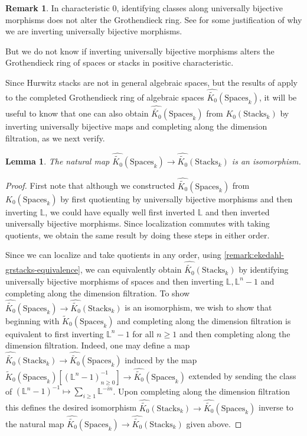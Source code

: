 \documentclass[12 pt]{amsart}
\newcommand{\rboxed}[1]{#1}
\theoremstyle{plain}
\newtheorem{lemma}[theorem]{Lemma}
\theoremstyle{definition}
\newtheorem{remark}[theorem]{Remark}
\theoremstyle{remark}
\numberwithin{equation}{section}
\newcommand\bl{\mathbb L}
\newcommand\grSpaces{K_0(\mathrm{Spaces}_k)} %
\newcommand\grcSpaces{\widehat{\widetilde{K_0}}(\mathrm{Spaces}_k)} %
\newcommand\grStacks{K_0(\mathrm{Stacks}_k)} %
\newcommand\grcStacks{\widehat{\widetilde{K_0}}(\mathrm{Stacks}_k)} %
\begin{document}
\begin{remark} \label{remark:} In characteristic $0$, identifying classes along
	universally bijective  morphisms does not alter the Grothendieck ring.  See
	\cite[Rem.\ 2.0.2, Rem.\
	7.3.2]{biluH:motivic-euler-products-in-motivic-statistics} for some
	justification of why we are inverting universally bijective morphisms.

	But we do not know if  inverting universally bijective
morphisms alters the Grothendieck ring of spaces or stacks in positive
characteristic.  
\end{remark}

Since Hurwitz stacks are not in general algebraic spaces, but
the results of \cite{biluH:motivic-euler-products-in-motivic-statistics}
apply to the completed Grothendieck ring of algebraic spaces
$\grcSpaces$,
it will be useful to know that one can also obtain $\grcSpaces$ from
$\grStacks$ by inverting universally bijective maps and completing
along the dimension filtration, as we next verify.

\begin{lemma}
	\label{lemma:spaces-ring-equals-stacks-ring}
	The natural map $\grcSpaces \to \grcStacks$ is an isomorphism.
\end{lemma}
\begin{proof}
First note that although we
	constructed $\grcSpaces$ from $\grSpaces$ by first quotienting by
	universally bijective morphisms and then inverting $\bl$, we could have
	equally well first inverted $\bl$ and then inverted universally bijective
	morphisms.  
 Since localization commutes with taking quotients, we obtain the same result by doing these steps in either order.

	Since we can localize and take quotients in any order,  using
	\autoref{remark:ekedahl-grstacks-equivalence}, we can equivalently
	obtain $\grcStacks$ by identifying universally bijective morphisms of
	spaces and then inverting $\bl, \bl^n - 1$ and completing along the
	dimension filtration.  To show $\grcSpaces \to \grcStacks$ is an
	isomorphism, we wish to show that beginning with
	$\widetilde{K}_0(\mathrm{Spaces}_k)$
	and completing along the dimension
	filtration is equivalent to first inverting $\bl^n -1$ for all $n \geq
	1$ and then completing along the dimension filtration.  Indeed, one may
	define a map $\grcStacks \to \grcSpaces$ induced by the map
	$\widetilde{K}_0(\mathrm{Spaces}_k)[(\bl^n-1)^{-1}_{n \geq 0}] \to
	\grcSpaces$ extended by sending the class of $(\bl^n-1)^{-1} \mapsto
	\sum_{i \geq 1} \bl^{-in}$.
	Upon completing along the dimension filtration this defines the desired
	isomorphism $\grcStacks \to \grcSpaces$ inverse to the natural map
	$\grcSpaces \to \grcStacks$ given above.  
\end{proof}
\end{document}

